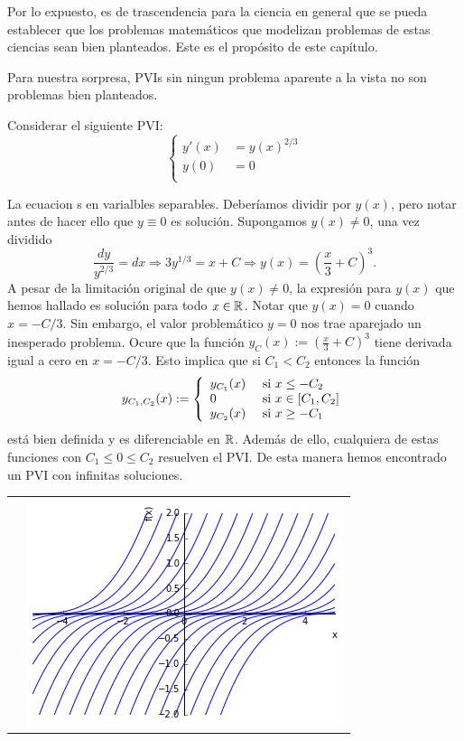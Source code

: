 Por lo expuesto, es de trascendencia para la ciencia en general que se pueda establecer que los problemas matemáticos que modelizan problemas de estas ciencias sean bien planteados. Este es el propósito de este capítulo.


Para nuestra sorpresa, PVIs sin ningun problema aparente a la vista no son problemas bien planteados.

\begin{ejemplo} Considerar el siguiente PVI:
\[
  \left\{
 \begin{array}{ll}
    y'(x)&=y(x)^{2/3}\\
    y(0)&=0\\
 \end{array}
 \right.
\]

La ecuacion  s en varialbles separables. Deberíamos dividir por $y(x)$, pero notar antes de hacer ello que $y\equiv 0$ es solución. Supongamos $y(x)\neq 0$, una vez dividido
\[\frac{dy}{y^{2/3}}=dx\Rightarrow 3y^{1/3}=x+C\Rightarrow y(x)=\left(\frac{x}{3}+C\right)^3.\]
A pesar de la limitación original de que $y(x)\neq 0$, la expresión para $y(x)$ que hemos hallado es solución para todo $x\in\mathbb{R}$. Notar que  $y(x)=0$ cuando $x=-C/3$. Sin embargo, el valor problemático $y=0$ nos trae aparejado un inesperado problema. Ocure  que la función $y_C(x):=\left(\frac{x}{3}+C\right)^3$ tiene derivada igual a cero en $x=-C/3$. Esto implica que si $C_1<C_2$ entonces la función 
\[
  y_{C_1,C_2}(x):=
  \left\{
 \begin{array}{ll}
    y_{C_1}(x)&\hbox{ si } x\leq-C_2\\
    0         &\hbox{ si } x\in [C_1,C_2]\\
    y_{C_2}(x) &\hbox{ si } x\geq -C_1\\
  \end{array}
 \right.
\]
está bien definida y es diferenciable en $\mathbb{R}$. Además de ello, cualquiera de estas funciones con $C_1\leq 0 \leq C_2$ resuelven el PVI.  De esta manera hemos encontrado un PVI con infinitas soluciones.
\end{ejemplo}

\begin{tabular}{m{6cm} m{6cm}}
\begin{minipage}{6cm}
  
\end{minipage}

&
\includegraphics[scale=.4]{imagenes/no-unicidad.png}
 \end{tabular}




